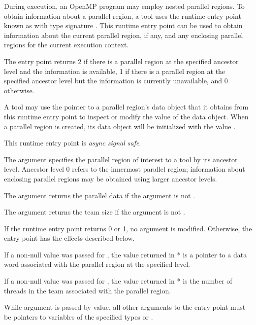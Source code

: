 \descr
During execution, an OpenMP program may employ nested parallel
regions.
To obtain information about a parallel region,
a tool uses the runtime entry point known as
with type signature .
This runtime entry point
can be used to obtain information about the current parallel region,
if any, and any enclosing parallel regions
for the current execution context.

The entry point returns 2 if there is a parallel region at the
specified ancestor level and the information is available,
1 if there is a parallel region at the specified ancestor level
but the information is currently unavailable, and 0 otherwise.

A tool may use the pointer to a parallel region's data object that it
obtains from this runtime entry point to inspect or modify the value
of the data object.  When a parallel region is created, its data
object will be initialized with the value .

This runtime entry point is \emph{async signal safe}.

\argdesc

The argument  specifies the parallel region
of interest to a tool by its ancestor level.  Ancestor level 0 refers
to the innermost parallel region; information about enclosing parallel
regions may be obtained using larger ancestor levels.

The argument  returns the parallel data
if the argument is not .

The argument  returns the team size if the argument is
not .

\effect

If the runtime entry point returns 0 or 1, no argument is modified. Otherwise,
the entry point has the effects described below.

If a non-null value was passed for , the
value returned in * is a pointer to a data word
associated with the parallel region at the specified level.

If a non-null value was passed for , the value
returned in * is the number of threads in the team
associated with the parallel region.

\constraints
While argument  is passed by
value, all other arguments to the entry point must be pointers
to variables of the specified types or .


